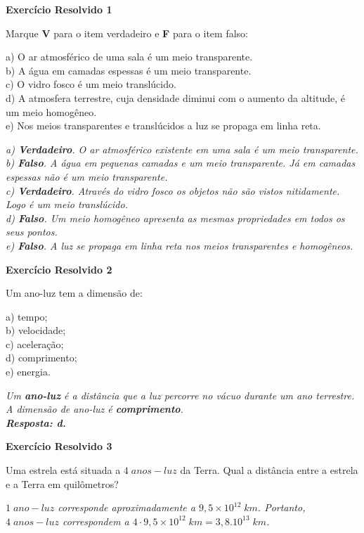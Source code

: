 \documentclass[11pt,twocolumn,oneside]{article}
\newenvironment{resposta*}
  {\bf Resposta:\\ }
  {}
\begin{document}
\textbf{Exercício Resolvido 1}


Marque \textbf{V} para o item verdadeiro e \textbf{F} para o item falso:


a) O ar atmosférico de uma sala é um meio transparente. \\
b) A água em camadas espessas é um meio transparente. \\
c) O vidro fosco é um meio translúcido. \\
d) A atmosfera terrestre, cuja densidade diminui com o aumento da altitude, é um meio homogêneo. \\
e) Nos meios transparentes e translúcidos a luz se propaga em linha reta.


\begin{resposta*}
{\it a) \textbf{Verdadeiro}. O ar atmosférico existente em uma sala é um meio transparente. \\
b) \textbf{Falso}. A água em pequenas camadas e um meio transparente. Já em camadas espessas não é um meio transparente. \\
c) \textbf{Verdadeiro}. Através do vidro fosco os objetos não são vistos nitidamente. Logo é um meio translúcido. \\
d) \textbf{Falso}. Um meio homogêneo apresenta as mesmas propriedades em todos os seus pontos. \\
e) \textbf{Falso}. A luz se propaga em linha reta nos meios transparentes e homogêneos.}
\end{resposta*}

\textbf{Exercício Resolvido 2}


Um ano-luz tem a dimensão de:


a) tempo; \\
b) velocidade; \\
c) aceleração; \\
d) comprimento; \\
e) energia.


\begin{resposta*}
{\it Um \textbf{ano-luz} é a distância que a luz percorre no vácuo durante um ano terrestre. A dimensão de ano-luz é \textbf{comprimento}. \\
\textbf{Resposta: d.}}
\end{resposta*}

\textbf{Exercício Resolvido 3}


Uma estrela está situada a $4\;anos-luz$ da Terra. Qual a distância entre a estrela e a Terra em quilômetros?


\begin{resposta*}
{\it $1\;ano-luz$ corresponde aproximadamente a $9,5\times 10^{12}\;km$. Portanto, $4\;anos-luz$ correspondem a $4\cdot 9,5\times 10^{12}\;km = 3,8.10^{13}\;km$.}
\end{resposta*}
\end{document}
